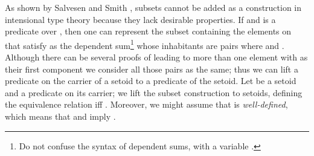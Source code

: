 \noindent As shown by Salvesen and Smith \cite{salvesen-subsets},
subsets cannot be added as a construction in intensional type theory
because they lack desirable properties. If
\AgdaSpace{}\AgdaSymbol{:}\AgdaSpace{}
and
\AgdaSpace{}\AgdaSymbol{:}\AgdaSpace{}\AgdaSpace{}\AgdaSpace{}
is a predicate over , then one can represent the subset
containing the elements on  that satisfy  as
the dependent sum\footnote{Do not confuse the syntax
  \AgdaFunction{Σ[}\AgdaSymbol{\AgdaUnderscore{}}\AgdaSymbol{\AgdaUnderscore{}}\AgdaFunction{]}
  of dependent sums, with a variable
  \AgdaSpace{}\AgdaSymbol{:}\AgdaSpace{}.}
\AgdaFunction{Σ[}\AgdaSpace{}\AgdaSpace{}\AgdaSpace{}\AgdaSpace{}\AgdaFunction{]}\AgdaSpace{}
whose inhabitants are pairs
\AgdaSymbol{(}\AgdaSpace{}\AgdaInductiveConstructor{,}\AgdaSpace{}\AgdaSymbol{)}
where \AgdaSpace{}\AgdaSymbol{:}\AgdaSpace{}
and
\AgdaSpace{}\AgdaSymbol{:}\AgdaSpace{}\AgdaSpace{}. Although
there can be several proofs of \AgdaSpace{}
leading to more than one element with  as their first
component we consider all those pairs as the same; thus we can lift a
predicate on the carrier of a setoid to a predicate of the setoid. Let
 be a setoid and
\AgdaSpace{}\AgdaSymbol{:}\AgdaSpace{}\AgdaSpace{}%
\AgdaSpace{}\AgdaSpace{}\AgdaSpace{}
a predicate on its carrier; we lift the subset construction to
setoids, defining the equivalence relation
\AgdaSymbol{(}\AgdaSpace{}\AgdaInductiveConstructor{,}\AgdaSpace{}\AgdaSymbol{)}\AgdaSpace{}\AgdaSpace{}
\AgdaSymbol{(}\AgdaSpace{}\AgdaInductiveConstructor{,}\AgdaSpace{}\AgdaSymbol{)}
iff
\AgdaSpace{}\AgdaSpace{}.
Moreover, we might assume that  is \emph{well-defined},
which means that
\AgdaSpace{}\AgdaSpace{}
and \AgdaSpace{} imply
\AgdaSpace{}.

